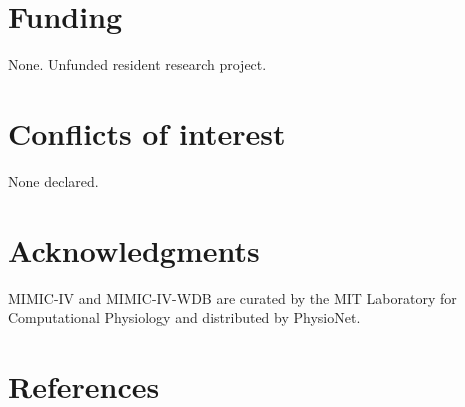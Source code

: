 \documentclass[twocolumn,letterpaper,10pt]{article}
\begin{document}
\section*{Funding}
None. Unfunded resident research project.

\section*{Conflicts of interest}
None declared.

\section*{Acknowledgments}
MIMIC-IV and MIMIC-IV-WDB are curated by the MIT Laboratory for Computational Physiology and distributed by PhysioNet.

\section*{References}
\end{document}
